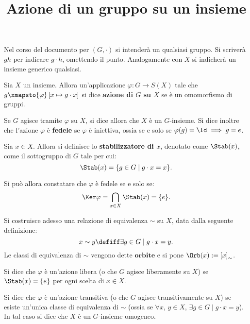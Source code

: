 \documentclass[12pt]{scrartcl}
\begin{document}
	\title{Azione di un gruppo su un insieme}
	\maketitle

	\begin{note}
		Nel corso del documento per $(G, \cdot)$ si intenderà un qualsiasi gruppo.
		Si scriverà $gh$ per indicare $g \cdot h$, omettendo il punto. Analogamente
		con $X$ si indicherà un insieme generico qualsiasi.
	\end{note}

	\begin{definition} Sia $X$ un insieme. Allora
		un'applicazione $\varphi : G \to S(X)$ tale che $g \xmapsto{\varphi} \left[ x \mapsto g \cdot x \right]$ si dice \textbf{azione di $G$ su $X$}
		se è un omomorfismo di gruppi. 
	\end{definition} \medskip
	
	
	Se $G$ agisce tramite $\varphi$ su $X$, si dice allora che $X$ è un $G$-insieme. Si dice inoltre che l'azione $\varphi$ è \textbf{fedele} se $\varphi$ è iniettiva,
	ossia se e solo se $\varphi(g) = \Id \implies g = e$.
	
	\begin{definition}[stabilizzatore] Sia $x \in X$. Allora si definisce lo
		\textbf{stabilizzatore di $x$}, denotato come $\Stab(x)$, come il sottogruppo di $G$ 
		tale per cui:
		\[ \Stab(x) = \{ g \in G \mid g \cdot x = x \}. \]
	\end{definition} \medskip


	Si può allora constatare che $\varphi$ è fedele se e solo se:
	\[ \Ker \varphi = \bigcap_{x \in X} \Stab(x) = \{e\}. \] \medskip
	
	
	Si costruisce adesso una relazione di equivalenza $\sim$ su $X$, data dalla
	seguente definizione:
	\[ x \sim y \defiff \exists g \in G \mid g \cdot x = y. \]
	Le classi di equivalenza di $\sim$ vengono dette $\textbf{orbite}$ e si
	pone $\Orb(x) := \left[ x \right]_\sim$. \medskip
	
	\begin{definition}
		Si dice che $\varphi$ è un'azione libera (o che $G$ agisce liberamente
		su $X$) se $\Stab(x) = \{e\}$ per ogni scelta di $x \in X$.
	\end{definition}
	
	\begin{definition}
		Si dice che $\varphi$ è un'azione transitiva (o che $G$ agisce transitivamente
		su $X$) se esiste un'unica classe di equivalenza di $\sim$ (ossia se
		$\forall x$, $y \in X$, $\exists g \in G \mid g \cdot x = y$). In tal
		caso si dice che $X$ è un $G$-insieme omogeneo.
	\end{definition}
	
\end{document}
